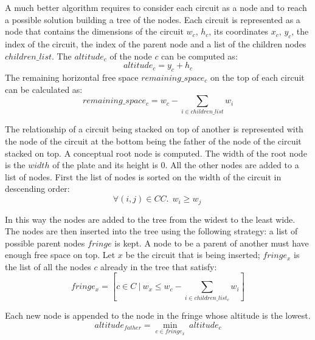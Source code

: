         A much better algorithm requires to consider each circuit as a node and to reach a possible solution building a tree of the nodes. 
        Each circuit is represented as a node that contains the dimensions of the circuit $w_c$, $h_c$, its coordinates 
        $x_c$, $y_c$, the index of the circuit, the index of the parent node and a list of the children nodes 
        $children\_list$. The $altitude_c$ of the node \(c\) can be computed as:
        \begin{equation*}
            altitude_c = y_c + h_c
        \end{equation*}
        The remaining horizontal free space \(remaining\_space_c\) on the top of each circuit can be calculated as:
        \begin{equation*}
            remaining\_space_c = w_c - \sum_{i \in children\_list} w_i
        \end{equation*}
        
        The relationship of a circuit being stacked on top of another is represented with the node of the circuit at the bottom 
        being the father of the node of the circuit stacked on top.
        A conceptual root node is computed. The width of the root node is the $width$ of the plate and its height is 0.
        All the other nodes are added to a list of nodes.
        First the list of nodes is sorted on the width of the circuit in descending order:
        \begin{equation*}
            \forall (i,j) \in CC.\ \ w_i \geq w_j \ 
        \end{equation*}
        
        In this way the nodes are added to the tree from the widest to the least wide.
        The nodes are then inserted into the tree using the following strategy: a list of possible parent nodes $fringe$ is kept. 
        A node to be a parent of another must have enough free space on top. Let $x$ be the circuit that 
        is being inserted; $fringe_x$ is the list of all the nodes $c$ already in the tree that satisfy: 
        \begin{equation*}
            fringe_x = \left[c \in C\ |\ w_x \leq w_c - \sum_{i \in children\_list_c} w_i\right]
        \end{equation*}
        
        Each new node is appended to the node in the fringe whose altitude is the lowest.
        \begin{equation*}
            altitude_{father} = \min_{c \in fringe_x}\ {altitude_c} 
        \end{equation*}

